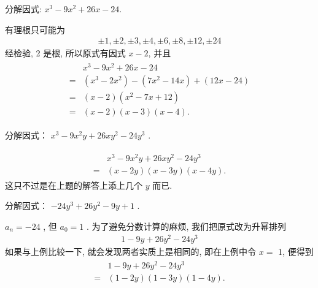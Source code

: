 \begin{example}
	分解因式: $x^{3}-9 x^{2}+26 x-24$.
\end{example}
\begin{solution}
	有理根只可能为
	\begin{align*}
		\pm 1, \pm 2, \pm 3, \pm 4, \pm 6, \pm 8, \pm 12, \pm 24
	\end{align*}
	经检验, 2 是根, 所以原式有因式 $x-2$, 并且
	\begin{align*}
		\begin{aligned}
			  & x^{3}-9 x^{2}+26 x-24                                          \\
			= & \left(x^{3}-2 x^{2}\right)-\left(7 x^{2}-14 x\right)+(12 x-24) \\
			= & (x-2)\left(x^{2}-7 x+12\right)                                 \\
			= & (x-2)(x-3)(x-4) .
		\end{aligned}
	\end{align*}
\end{solution}

\begin{example}
	分解因式： $x^{3}-9 x^{2} y+26 x y^{2}-24 y^{3}$ .
\end{example}
\begin{solution}
	\begin{align*}
		\begin{aligned}
			  & x^{3}-9 x^{2} y+26 x y^{2}-24 y^{3} \\
			= & (x-2 y)(x-3 y)(x-4 y) .
		\end{aligned}
	\end{align*}
	这只不过是在上题的解答上添上几个 $y$ 而已.
\end{solution}

\begin{example}
	分解因式： $-24 y^{3}+26 y^{2}-9 y+1$ .
\end{example}
\begin{solution}
	$a_{n}=-24$ , 但 $a_{0}=1$ . 为了避免分数计算的麻烦, 我们把原式改为升幂排列
	\begin{align*}
		1-9 y+26 y^{2}-24 y^{3}
	\end{align*}
	如果与上例比较一下, 就会发现两者实质上是相同的, 即在上例中令 $x=$ 1, 便得到
	\begin{align*}
		\begin{aligned}
			  & 1-9 y+26 y^{2}-24 y^{3} \\
			= & (1-2 y)(1-3 y)(1-4 y) .
		\end{aligned}
	\end{align*}
\end{solution}

